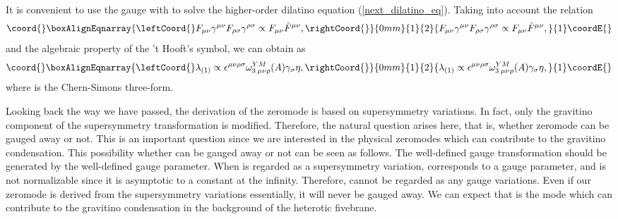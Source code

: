 \documentclass[a4paper,aps, amssymb, preprint, 12pt]{revtex4}
\begin{document}
It is convenient to use the gauge with \coordHE{} to solve the higher-order dilatino equation (\ref{next_dilatino_eq}).
Taking into account the relation
\begin{eqnarray}\coord{}\boxAlignEqnarray{\leftCoord{}
F_{\mu\nu}\gamma^{\mu\nu}F_{\rho\sigma}\gamma^{\rho\sigma} \propto F_{\mu\nu}\tilde{F}^{\mu\nu},
\rightCoord{}}{0mm}{1}{2}{
F_{\mu\nu}\gamma^{\mu\nu}F_{\rho\sigma}\gamma^{\rho\sigma} \propto F_{\mu\nu}\tilde{F}^{\mu\nu},
}{1}\coordE{}\end{eqnarray}
and the algebraic property of the 't Hooft's \myHighlight{$\overline{\eta}$}\coordHE{} symbol, we can obtain \coordHE{} as
\begin{eqnarray}\coord{}\boxAlignEqnarray{\leftCoord{}
\lambda_{(1)} \propto {\epsilon}^{\mu\nu\rho\sigma}\omega_{3\:\mu\nu\rho}^{YM}(A){\gamma}_{\sigma}\eta,
\rightCoord{}}{0mm}{1}{2}{
\lambda_{(1)} \propto {\epsilon}^{\mu\nu\rho\sigma}\omega_{3\:\mu\nu\rho}^{YM}(A){\gamma}_{\sigma}\eta,
}{1}\coordE{}\end{eqnarray}
where \coordHE{} is the Chern-Simons three-form.

Looking back the way we have passed, the derivation of the zeromode \coordHE{} is based on supersymmetry variations.
In fact, only the gravitino component of the supersymmetry transformation is modified.
Therefore, the natural question arises here, that is, whether zeromode \coordHE{} can be gauged away or not.
This is an important question since we are interested in the physical zeromodes which can contribute to the gravitino condensation.
This possibility whether \coordHE{} can be gauged away or not can be seen as follows.
The well-defined gauge transformation should be generated by the well-defined gauge parameter.
When \coordHE{} is regarded as a supersymmetry variation, \myHighlight{$\eta$}\coordHE{} corresponds to a gauge parameter, and is not normalizable since it is asymptotic to a constant \coordHE{} at the infinity.
Therefore, \coordHE{} cannot be regarded as any gauge variations.
Even if our zeromode is derived from the supersymmetry variations essentially, it will never be gauged away.
We can expect that \coordHE{} is the mode which can contribute to the gravitino condensation in the background of the heterotic fivebrane.
\end{document}

